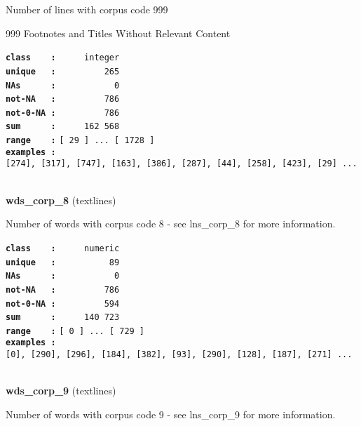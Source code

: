 \documentclass[]{article}
\begin{document}
Number of lines with corpus code 999

999 Footnotes and Titles Without Relevant Content

\textbf{\texttt{class\ \ \ \ :}} \texttt{~~~~~integer}\\
\textbf{\texttt{unique\ \ \ :}} \texttt{~~~~~~~~~265}\\
\textbf{\texttt{NAs\ \ \ \ \ \ :}} \texttt{~~~~~~~~~~~0}\\
\textbf{\texttt{not-NA\ \ \ :}} \texttt{~~~~~~~~~786}\\
\textbf{\texttt{not-0-NA\ :}} \texttt{~~~~~~~~~786}\\
\textbf{\texttt{sum\ \ \ \ \ \ :}} \texttt{~~~~~162~568}\\
\textbf{\texttt{range\ \ \ \ :}}
\texttt{{[}\ 29\ {]}\ ...\ {[}\ 1728\ {]}}\\
\textbf{\texttt{examples\ :}}
\texttt{{[}274{]},\ {[}317{]},\ {[}747{]},\ {[}163{]},\ {[}386{]},\ {[}287{]},\ {[}44{]},\ {[}258{]},\ {[}423{]},\ {[}29{]}\ ...}\\

~

\textbf{wds\_corp\_8} (textlines)

Number of words with corpus code 8 - see lns\_corp\_8 for more
information.

\textbf{\texttt{class\ \ \ \ :}} \texttt{~~~~~numeric}\\
\textbf{\texttt{unique\ \ \ :}} \texttt{~~~~~~~~~~89}\\
\textbf{\texttt{NAs\ \ \ \ \ \ :}} \texttt{~~~~~~~~~~~0}\\
\textbf{\texttt{not-NA\ \ \ :}} \texttt{~~~~~~~~~786}\\
\textbf{\texttt{not-0-NA\ :}} \texttt{~~~~~~~~~594}\\
\textbf{\texttt{sum\ \ \ \ \ \ :}} \texttt{~~~~~140~723}\\
\textbf{\texttt{range\ \ \ \ :}}
\texttt{{[}\ 0\ {]}\ ...\ {[}\ 729\ {]}}\\
\textbf{\texttt{examples\ :}}
\texttt{{[}0{]},\ {[}290{]},\ {[}296{]},\ {[}184{]},\ {[}382{]},\ {[}93{]},\ {[}290{]},\ {[}128{]},\ {[}187{]},\ {[}271{]}\ ...}\\

~

\textbf{wds\_corp\_9} (textlines)

Number of words with corpus code 9 - see lns\_corp\_9 for more
information.
\end{document}
